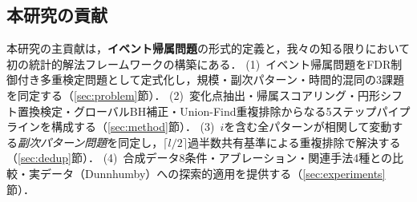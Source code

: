 \subsection{本研究の貢献}

本研究の主貢献は，\textbf{イベント帰属問題}の形式的定義と，我々の知る限りにおいて初の統計的解法フレームワークの構築にある．
(1)~イベント帰属問題をFDR制御付き多重検定問題として定式化し，規模・副次パターン・時間的混同の3課題を同定する（\ref{sec:problem}節）．
(2)~変化点抽出・帰属スコアリング・円形シフト置換検定・グローバルBH補正・Union-Find重複排除からなる5ステップパイプラインを構成する（\ref{sec:method}節）．
(3)~$i$を含む全パターンが相関して変動する\emph{副次パターン問題}を同定し，$\lceil l/2 \rceil$過半数共有基準による重複排除で解決する（\ref{sec:dedup}節）．
(4)~合成データ8条件・アブレーション・関連手法4種との比較・実データ（Dunnhumby）への探索的適用を提供する（\ref{sec:experiments}節）．
